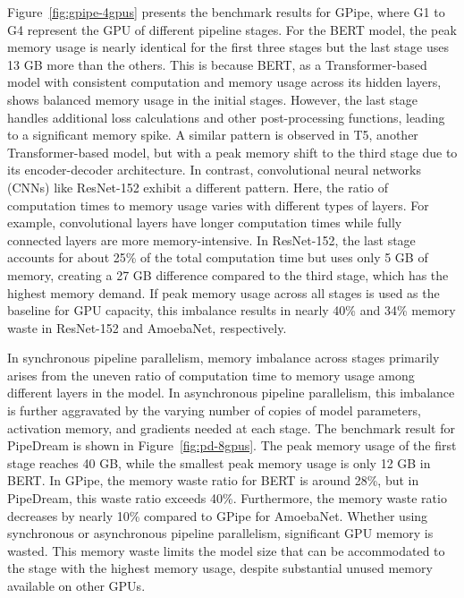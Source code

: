 Figure~\ref{fig:gpipe-4gpus} presents the benchmark results for GPipe, where G1 to G4 represent the GPU of different pipeline stages.
For the BERT model, the peak memory usage is nearly identical for the first three stages
but the last stage uses 13 GB more than the others.
This is because BERT, as a Transformer-based model with consistent computation and memory usage across its hidden layers,
shows balanced memory usage in the initial stages.
However, the last stage handles additional loss calculations and other post-processing functions,
leading to a significant memory spike.
A similar pattern is observed in T5, another Transformer-based model,
but with a peak memory shift to the third stage due to its encoder-decoder architecture.
In contrast, convolutional neural networks (CNNs) like ResNet-152 exhibit a different pattern.
Here, the ratio of computation times to memory usage varies with different types of layers.
For example, convolutional layers have longer computation times
while fully connected layers are more memory-intensive.
In ResNet-152, the last stage accounts for about 25\% of the total computation time but uses only 5 GB of memory,
creating a 27 GB difference compared to the third stage, which has the highest memory demand.
If peak memory usage across all stages is used as the baseline for GPU capacity,
this imbalance results in nearly 40\% and 34\% memory waste in ResNet-152 and AmoebaNet, respectively.

In synchronous pipeline parallelism,
memory imbalance across stages primarily arises from the uneven ratio
of computation time to memory usage among different layers in the model.
In asynchronous pipeline parallelism, this imbalance is further aggravated
by the varying number of copies of model parameters, activation memory, and gradients needed at each stage.
The benchmark result for PipeDream is shown in Figure~\ref{fig:pd-8gpus}.
The peak memory usage of the first stage reaches 40 GB,
while the smallest peak memory usage is only 12 GB in BERT.
In GPipe, the memory waste ratio for BERT is around 28\%, but in PipeDream, this waste ratio exceeds 40\%.
Furthermore, the memory waste ratio decreases by nearly 10\% compared to GPipe for AmoebaNet.
Whether using synchronous or asynchronous pipeline parallelism, significant GPU memory is wasted.
This memory waste limits the model size that can be accommodated to the stage with the highest memory usage,
despite substantial unused memory available on other GPUs.

